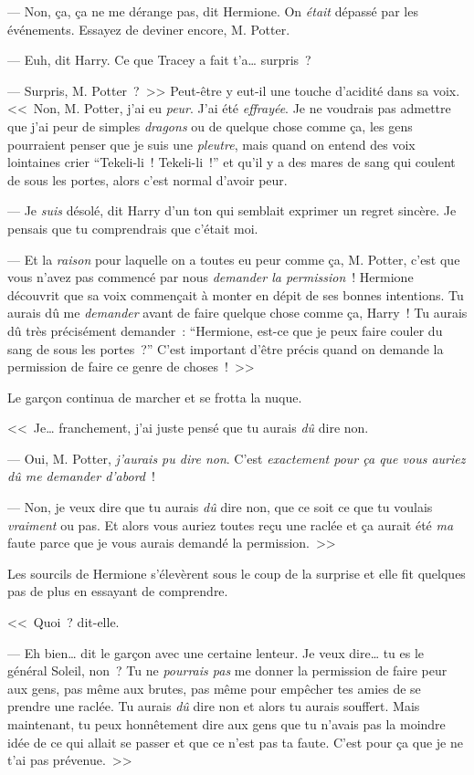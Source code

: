 --- Non, ça, ça ne me dérange pas, dit Hermione. On \emph{était} dépassé par les événements. Essayez de deviner encore, M. Potter.

--- Euh, dit Harry. Ce que Tracey a fait t'a… surpris~?

--- Surpris, M. Potter~?~>> Peut-être y eut-il une touche d'acidité dans sa voix. <<~Non, M. Potter, j'ai eu \emph{peur}. J'ai été \emph{effrayée}. Je ne voudrais pas admettre que j'ai peur de simples \emph{dragons} ou de quelque chose comme ça, les gens pourraient penser que je suis une \emph{pleutre}, mais quand on entend des voix lointaines crier “Tekeli-li~! Tekeli-li~!” et qu'il y a des mares de sang qui coulent de sous les portes, alors c'est normal d'avoir peur.

--- Je \emph{suis} désolé, dit Harry d'un ton qui semblait exprimer un regret sincère. Je pensais que tu comprendrais que c'était moi.

--- Et la \emph{raison} pour laquelle on a toutes eu peur comme ça, M. Potter, c'est que vous n'avez pas commencé par nous \emph{demander la permission}~! Hermione découvrit que sa voix commençait à monter en dépit de ses bonnes intentions. Tu aurais dû me \emph{demander} avant de faire quelque chose comme ça, Harry~! Tu aurais dû très précisément demander~: “Hermione, est-ce que je peux faire couler du sang de sous les portes~?” C'est important d'être précis quand on demande la permission de faire ce genre de choses~!~>>

Le garçon continua de marcher et se frotta la nuque.

<<~Je… franchement, j'ai juste pensé que tu aurais \emph{dû} dire non.

--- Oui, M. Potter, \emph{j'aurais pu dire non}. C'est \emph{exactement pour ça que vous auriez dû me demander d'abord}~!

--- Non, je veux dire que tu aurais \emph{dû} dire non, que ce soit ce que tu voulais \emph{vraiment} ou pas. Et alors vous auriez toutes reçu une raclée et ça aurait été \emph{ma} faute parce que je vous aurais demandé la permission.~>>

Les sourcils de Hermione s'élevèrent sous le coup de la surprise et elle fit quelques pas de plus en essayant de comprendre.

<<~Quoi~? dit-elle.

--- Eh bien… dit le garçon avec une certaine lenteur. Je veux dire… tu es le général Soleil, non~? Tu ne \emph{pourrais pas} me donner la permission de faire peur aux gens, pas même aux brutes, pas même pour empêcher tes amies de se prendre une raclée. Tu aurais \emph{dû} dire non et alors tu aurais souffert. Mais maintenant, tu peux honnêtement dire aux gens que tu n'avais pas la moindre idée de ce qui allait se passer et que ce n'est pas ta faute. C'est pour ça que je ne t'ai pas prévenue.~>>

